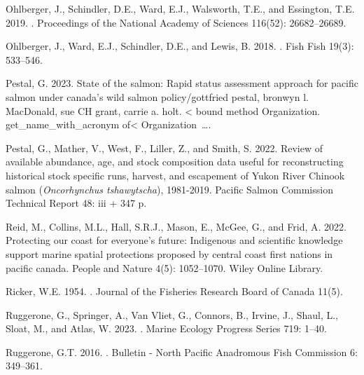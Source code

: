\documentclass[11pt]{book}
\begin{document}
\begin{CSLReferences}{1}{0}
%
Ohlberger, J., Schindler, D.E., Ward, E.J., Walsworth, T.E., and Essington, T.E. 2019. . Proceedings of the National Academy of Sciences 116(52): 26682--26689.

%
Ohlberger, J., Ward, E.J., Schindler, D.E., and Lewis, B. 2018. . Fish Fish 19(3): 533--546.

%
Pestal, G. 2023. State of the salmon: Rapid status assessment approach for pacific salmon under canada's wild salmon policy/gottfried pestal, bronwyn l. MacDonald, sue CH grant, carrie a. holt. \textless{} bound method Organization. get\_name\_with\_acronym of\textless{} Organization~\ldots.

%
Pestal, G., Mather, V., West, F., Liller, Z., and Smith, S. 2022. Review of available abundance, age, and stock composition data useful for reconstructing historical stock specific runs, harvest, and escapement of {Y}ukon {R}iver {C}hinook salmon (\emph{{O}ncorhynchus tshawytscha}), 1981-2019. Pacific Salmon Commission Technical Report 48: iii + 347 p.

%
Reid, M., Collins, M.L., Hall, S.R.J., Mason, E., McGee, G., and Frid, A. 2022. Protecting our coast for everyone's future: Indigenous and scientific knowledge support marine spatial protections proposed by central coast first nations in pacific canada. People and Nature 4(5): 1052--1070. Wiley Online Library.

%
Ricker, W.E. 1954. . Journal of the Fisheries Research Board of Canada 11(5).

%
Ruggerone, G., Springer, A., Van Vliet, G., Connors, B., Irvine, J., Shaul, L., Sloat, M., and Atlas, W. 2023. . Marine Ecology Progress Series 719: 1--40.

%
Ruggerone, G.T. 2016. . Bulletin - North Pacific Anadromous Fish Commission 6: 349--361.


\end{CSLReferences}
\end{document}

